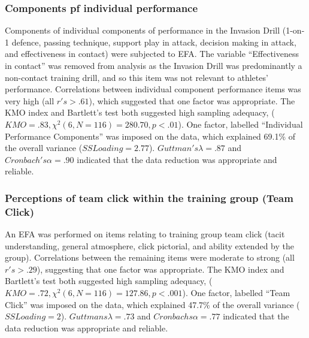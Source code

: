 \begin{CJK}{UTF8}{gbsn}
\subsubsection{Components pf individual performance\label{app9:dataReductionPerformance}}
Components of individual components of performance in the Invasion Drill (1-on-1 defence, passing technique, support play in attack, decision making in attack, and effectiveness in contact) were subjected to EFA.  The variable ``Effectiveness in contact'' was removed from analysis as the Invasion Drill was predominantly a non-contact training drill, and so this item was not relevant to athletes' performance.  Correlations between individual component performance items was very high (all $r's > .61$), which suggested that one factor was appropriate.  The KMO index and Bartlett's test both suggested high sampling adequacy, ($KMO = .83, \chi^2(6, N = 116) = 280.70, p < .01$). One factor, labelled ``Individual Performance Components'' was imposed on the data, which explained 69.1\% of the overall variance ($SS Loading = 2.77$).  $Guttman's \lambda = .87$  and  $Cronbach's \alpha = .90$ indicated that the data reduction was appropriate and reliable.

\subsubsection{Perceptions of team click within the training group (Team Click)}
An EFA was performed on items relating to training group team click (tacit understanding, general atmosphere, click pictorial, and ability extended by the group).  Correlations between the remaining items were moderate to strong (all $r's > .29$), suggesting that one factor was appropriate. The KMO index and Bartlett's test both suggested high sampling adequacy, ($KMO =  .72, \chi^2(6, N = 116) = 127.86, p < .001$).
One factor, labelled ``Team Click'' was imposed on the data, which explained 47.7\% of the overall variance ($SS Loading = 2$). $Guttmans \lambda = .73$ and $Cronbachs \alpha = .77$ indicated that the data reduction was appropriate and reliable.



\end{CJK}
